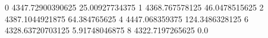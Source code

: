 0 4347.72900390625 25.00927734375
1 4368.767578125 46.0478515625
2 4387.1044921875 64.384765625
4 4447.068359375 124.3486328125
6 4328.63720703125 5.91748046875
8 4322.7197265625 0.0
